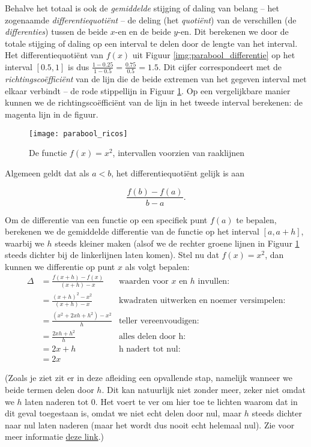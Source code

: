     
Behalve het totaal is ook de \textit{gemiddelde} stijging of daling van belang – het zogenaamde \textit{differentiequotiënt} – de deling (het \textit{quotiënt}) van de verschillen (de \textit{differenties}) tussen de beide $x$-en en de beide $y$-en. Dit berekenen we door de totale stijging of daling op een interval te delen door de lengte van het interval. Het differentiequotiënt van $f(x)$ uit Figuur \ref{img:parabool_differentie} op het interval $\left[0.5,1\right]$ is dus $\frac{1-0.25}{1-0.5} = \frac{0.75}{0.5} = 1.5$. Dit cijfer correspondeert met de \textit{richtingscoëfficiënt} van de lijn die de beide extremen van het gegeven interval met elkaar verbindt – de rode stippellijn in Figuur \ref{img:parabool_ricos}. Op een vergelijkbare manier kunnen we de richtingscoëfficiënt van de lijn in het tweede interval berekenen: de magenta lijn in de figuur. 

\begin{figure}[h]
    \centering
    \texttt{[image: parabool\_ricos]}
    \caption{De functie $f(x) = x^2$, intervallen voorzien van raaklijnen\label{img:parabool_ricos}}
\end{figure}

Algemeen geldt dat als $a<b$, het differentiequotiënt gelijk is aan

\[
    \frac{f(b)-f(a)}{b-a}.
\]

Om de differentie van een functie op een specifiek punt $f(a)$ te bepalen, berekenen we de gemiddelde differentie van de functie op het interval $\left[a,a+h\right]$, waarbij we $h$ steeds kleiner maken (alsof we de rechter groene lijnen in Figuur \ref{img:parabool_ricos} steeds dichter bij de linkerlijnen laten komen). Stel nu dat $f(x)=x^2$, dan kunnen we differentie op punt $x$ als volgt bepalen:
\[
\begin{aligned}
    \Delta &= \frac{f(x+h)-f(x)}{(x+h) - x} & \text{waarden voor } x \text{ en } h \text{ invullen:}\\
    &= \frac{(x+h)^2 - x^2}{(x+h)-x} & \text{kwadraten uitwerken en noemer versimpelen:} \\
    &= \frac{(x^2 + 2xh + h^2)-x^2}{h} & \text {teller vereenvoudigen:} \\
    &= \frac{2xh + h^2}{h} & \text{alles delen door h:} \\
    &= 2x + h & \text{h nadert tot nul:} \\
    &= 2x
\end{aligned}
\]            

(Zoals je ziet zit er in deze afleiding een opvallende stap, namelijk wanneer we beide termen delen door $h$. Dit kan natuurlijk niet zonder meer, zeker niet omdat we $h$ laten naderen tot 0. Het voert te ver om hier toe te lichten waarom dat in dit geval toegestaan is, omdat we niet echt delen door nul, maar $h$ steeds dichter naar nul laten naderen (maar het wordt dus nooit echt helemaal nul). Zie voor meer informatie \href{https://www.wisfaq.nl/pagina.asp?nummer=1451}{deze link}.)

